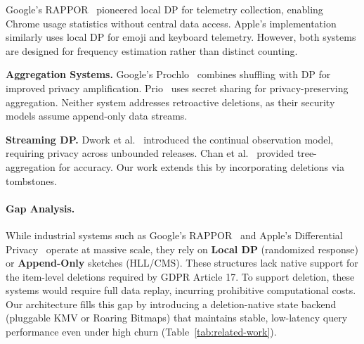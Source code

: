 \documentclass[sigconf,anonymous,review]{acmart}
\begin{document}
Google's RAPPOR~\cite{Erlingsson2014} pioneered local DP for telemetry collection, enabling Chrome usage statistics without central data access. Apple's implementation~\cite{Apple2017} similarly uses local DP for emoji and keyboard telemetry. However, both systems are designed for frequency estimation rather than distinct counting.

\textbf{Aggregation Systems.} Google's Prochlo~\cite{Bittau2017} combines shuffling with DP for improved privacy amplification. Prio~\cite{Corrigan-Gibbs2017} uses secret sharing for privacy-preserving aggregation. Neither system addresses retroactive deletions, as their security models assume append-only data streams.

\textbf{Streaming DP.} Dwork et al.~\cite{Dwork2010} introduced the continual observation model, requiring privacy across unbounded releases. Chan et al.~\cite{Chan2011} provided tree-aggregation for accuracy. Our work extends this by incorporating deletions via tombstones.

\paragraph{Gap Analysis.} While industrial systems such as Google's RAPPOR~\cite{Erlingsson2014} and Apple's Differential Privacy~\cite{Apple2017} operate at massive scale, they rely on \textbf{Local DP} (randomized response) or \textbf{Append-Only} sketches (HLL/CMS). These structures lack native support for the item-level deletions required by GDPR Article 17. To support deletion, these systems would require full data replay, incurring prohibitive computational costs. Our architecture fills this gap by introducing a deletion-native state backend (pluggable KMV or Roaring Bitmaps) that maintains stable, low-latency query performance even under high churn (Table~\ref{tab:related-work}).
\end{document}
